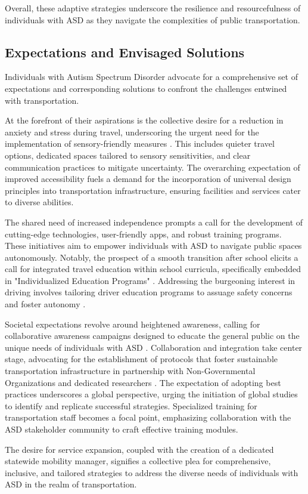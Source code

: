    Overall, these adaptive strategies underscore the resilience and resourcefulness of individuals with ASD as they navigate the complexities of public transportation.

\subsection{Expectations and Envisaged Solutions}

    Individuals with Autism Spectrum Disorder advocate for a comprehensive set of expectations and corresponding solutions to confront the challenges entwined with transportation. 
    
    At the forefront of their aspirations is the collective desire for a reduction in anxiety and stress during travel, underscoring the urgent need for the implementation of sensory-friendly measures \cite{deka_co-principal_nodate}. This includes quieter travel options, dedicated spaces tailored to sensory sensitivities, and clear communication practices to mitigate uncertainty.
    The overarching expectation of improved accessibility fuels a demand for the incorporation of universal design principles into transportation infrastructure, ensuring facilities and services cater to diverse abilities.
    
    The shared need of increased independence prompts a call for the development of cutting-edge technologies, user-friendly apps, and robust training programs. These initiatives aim to empower individuals with ASD to navigate public spaces autonomously. 
    Notably, the prospect of a smooth transition after school elicits a call for integrated travel education within school curricula, specifically embedded in "Individualized Education Programs" \cite{deka_co-principal_nodate}. 
    Addressing the burgeoning interest in driving involves tailoring driver education programs to assuage safety concerns and foster autonomy \cite{deka_co-principal_nodate}. 
    
    Societal expectations revolve around heightened awareness, calling for collaborative awareness campaigns designed to educate the general public on the unique needs of individuals with ASD \cite{deka_co-principal_nodate}. Collaboration and integration take center stage, advocating for the establishment of protocols that foster sustainable transportation infrastructure in partnership with Non-Governmental Organizations and dedicated researchers \cite{deka_co-principal_nodate}. 
    The expectation of adopting best practices underscores a global perspective, urging the initiation of global studies to identify and replicate successful strategies. Specialized training for transportation staff becomes a focal point, emphasizing collaboration with the ASD stakeholder community to craft effective training modules. 

    The desire for service expansion, coupled with the creation of a dedicated statewide mobility manager, signifies a collective plea for comprehensive, inclusive, and tailored strategies to address the diverse needs of individuals with ASD in the realm of transportation.
